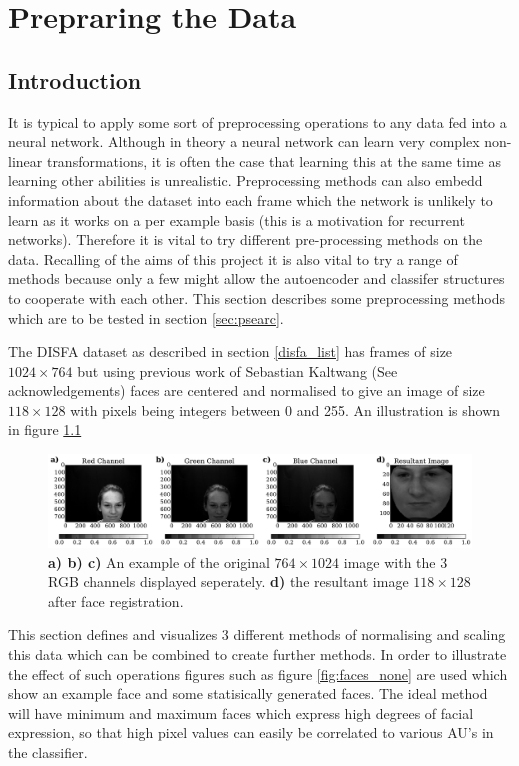 \chapter{Prepraring the Data}
  \section{Introduction}
    It is typical to apply some sort of preprocessing operations to any data fed into
    a neural network. Although in theory a neural network can learn very complex
    non-linear transformations, it is often the case that learning this at the same
    time as learning other abilities is unrealistic. Preprocessing methods can
    also embedd information about the dataset into each frame which the network is
    unlikely to learn as it works on a per example basis (this is a motivation for
    recurrent networks).
     Therefore it is vital to try
    different pre-processing methods on the data.
    Recalling of the aims of this project it is also vital to try a range of methods
    because only a few
    might allow the autoencoder and classifer structures to cooperate with each other.
    This section describes some preprocessing methods which are to be
    tested in section \ref{sec:psearc}.


    The DISFA dataset as described in section \ref{disfa_list} has frames of size $ 1024 \times 764 $
    but using previous work of Sebastian Kaltwang (See acknowledgements) faces are
    centered and normalised to give an image of size $118 \times 128$
    with pixels being integers between
    0 and 255. An illustration is shown in figure \ref{fig:sebproc}

    \begin{figure}[!h] \centering
    \includegraphics[width =\hsize]{figures/seb_preproc.pdf}
    \caption{ {\bf a) b) c)} An example of the original $764 \times 1024$ image with
    the 3 RGB channels displayed seperately. {\bf d)} the resultant image
    $118 \times 128$ after face registration.} \label{fig:sebproc} \end{figure}

    This section defines and visualizes 3 different methods of normalising and scaling
    this data which can be combined to create further methods. In order to illustrate
    the effect of such operations figures such as figure \ref{fig:faces_none} are used which
    show an example face and some statisically generated faces. The ideal method will
    have minimum and maximum faces which express high degrees of facial expression, so that
    high pixel values can easily be correlated to various AU's in the classifier.


